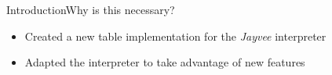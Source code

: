 \begin{frame}[t]{Introduction}{Why is this necessary?} %
	\begin{itemize}
		\item Created a new table implementation for the \emph{Jayvee} interpreter
		\item Adapted the interpreter to take advantage of new features
	\end{itemize}
\end{frame}
